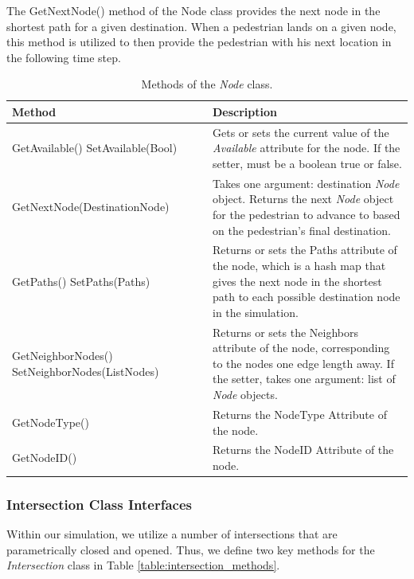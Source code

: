 \documentclass[12pt]{article}
\begin{document}
The GetNextNode() method of the Node class provides the next node in the
shortest path for a given destination. When a pedestrian lands on a given node,
this method is utilized to then provide the pedestrian with his next location
in the following time step.

\def\arraystretch{1.5}
\begin{table}
  \centering
    \begin{tabular}{p{0.5\linewidth}p{0.5\linewidth}}
     \hline
     Method & Description \\
     \hline
     GetAvailable() \newline SetAvailable(Bool)  & Gets or sets the current
                        value of the \textit{Available} attribute for the node.
                        If the setter, must be a boolean true or false. \\
     GetNextNode(DestinationNode) & Takes one argument: destination
                                    \textit{Node} object. Returns the next
                                    \textit{Node} object for the pedestrian to
                                    advance to based on the pedestrian’s final
                                    destination. \\
     GetPaths() \newline SetPaths(Paths) & Returns or sets the Paths attribute
                of the node, which is a hash map that gives the next node in
                the shortest path to each possible destination node in the
                simulation. \\
     GetNeighborNodes() \newline SetNeighborNodes(ListNodes) & Returns or sets
                        the Neighbors attribute of the node, corresponding to
                        the nodes one edge length away. If the setter, takes
                        one argument: list of \textit{Node} objects. \\
     GetNodeType() & Returns the NodeType Attribute of the node. \\
     GetNodeID() & Returns the NodeID Attribute of the node. \\
     \hline
    \end{tabular}
    \caption{Methods of the \textit{Node} class.}
  \label{table:node_methods}
\end{table}

\subsubsection{Intersection Class Interfaces}
Within our simulation, we utilize a number of intersections that are
parametrically closed and opened. Thus, we define two key methods for the
\textit{Intersection} class in Table \ref{table:intersection_methods}.
\end{document}
